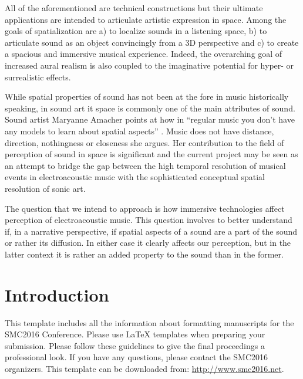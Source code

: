 \documentclass{article}
\begin{document}
All of the aforementioned are technical constructions but their ultimate applications are intended to articulate artistic expression in space. Among the goals of spatialization are a) to localize sounds in a listening space, b) to articulate sound as an object convincingly from a 3D perspective and c) to create a spacious and immersive musical experience. Indeed, the overarching goal of increased aural realism is also coupled to the imaginative potential for hyper- or surrealistic effects.

While spatial properties of sound has not been at the fore in music historically speaking, in sound art it space is commonly one of the main attributes of sound. Sound artist Maryanne Amacher points at how in “regular music you don't have any models to learn about spatial aspects” \cite{labelle06}. Music does not have distance, direction, nothingness or closeness she argues. Her contribution to the field of perception of sound in space is significant and the current project may be seen as an attempt to bridge the gap between the high temporal resolution of musical events in electroacoustic music with the sophisticated conceptual spatial resolution of sonic art.

The question that we intend to approach is how immersive technologies affect perception of electroacoustic music. This question involves to better understand if, in a narrative perspective, if spatial aspects of a sound are a part of the sound or rather its diffusion. In either case it clearly affects our perception, but in the latter context it is rather an added property to the sound than in the former.

\section{Introduction}\label{sec:introduction}
This template includes all the information about formatting manuscripts for 
the SMC2016 Conference.
Please use \LaTeX{} templates when 
preparing your submission.
Please follow these guidelines to give the final proceedings a professional look.
If you have any questions, please contact the SMC2016 organizers.
This template can be downloaded from:
\url{http://www.smc2016.net}.
\end{document}
